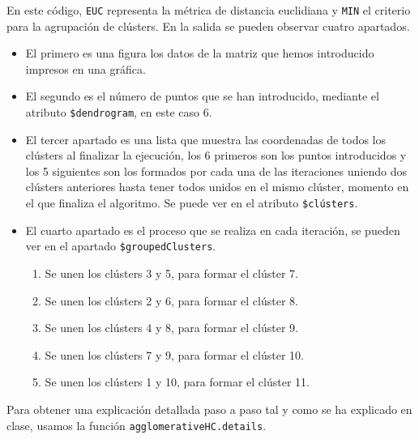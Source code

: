 \documentclass[12pt]{report}\usepackage[]{graphicx}\usepackage[dvipsnames]{xcolor}
\begin{document}
				En este código, \texttt{EUC} representa la métrica de distancia euclidiana y \texttt{MIN} el criterio para la agrupación de clústers. En la salida se pueden observar cuatro apartados.
				
				\begin{itemize}
					\item El primero es una figura los datos de la matriz que hemos introducido impresos en una gráfica.
					
					\item El segundo es el número de puntos que se han introducido, mediante el atributo \texttt{\$dendrogram}, en este caso 6.
					
					\item El tercer apartado es una lista que muestra las coordenadas de todos los clústers al finalizar la ejecución, los 6 primeros son los puntos introducidos y los 5 siguientes son los formados por cada una de las iteraciones uniendo dos clústers anteriores hasta tener todos unidos en el mismo clúster, momento en el que finaliza el algoritmo. Se puede ver en el atributo \texttt{\$clústers}.
					
					\item El cuarto apartado es el proceso que se realiza en cada iteración, se pueden ver en el apartado \texttt{\$groupedClusters}.
					
					\begin{enumerate}[label = \textbf{\arabic*.}]
						\item Se unen los clústers 3 y 5, para formar el clúster 7.
						\item Se unen los clústers 2 y 6, para formar el clúster 8.
						\item Se unen los clústers 4 y 8, para formar el clúster 9.
						\item Se unen los clústers 7 y 9, para formar el clúster 10.
						\item Se unen los clústers 1 y 10, para formar el clúster 11.
					\end{enumerate}
					
				\end{itemize}
				
				Para obtener una explicación detallada paso a paso tal y como se ha explicado en clase, usamos la función \texttt{agglomerativeHC.details}.
				
\end{document}
